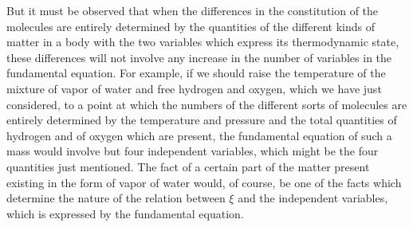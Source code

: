 \documentclass[12pt]{article}
\begin{document}
But it must be observed that when the differences in the constitution of the molecules are entirely determined by the quantities of the different kinds of matter in a body with the two variables which express its thermodynamic state, these differences will not involve any increase in the number of variables in the fundamental equation. For example, if we should raise the temperature of the mixture of vapor of water and free hydrogen and oxygen, which we have just considered, to a point at which the numbers of the different sorts of molecules are entirely determined by the temperature and pressure and the total quantities of hydrogen and of oxygen which are present, the fundamental equation of such a mass would involve but four independent variables, which might be the four quantities just mentioned. The fact of a certain part of the matter present existing in the form of vapor of water would, of course, be one of the facts which determine the nature of the relation between $\xi$ and the independent variables, which is expressed by the fundamental equation.
\end{document}

